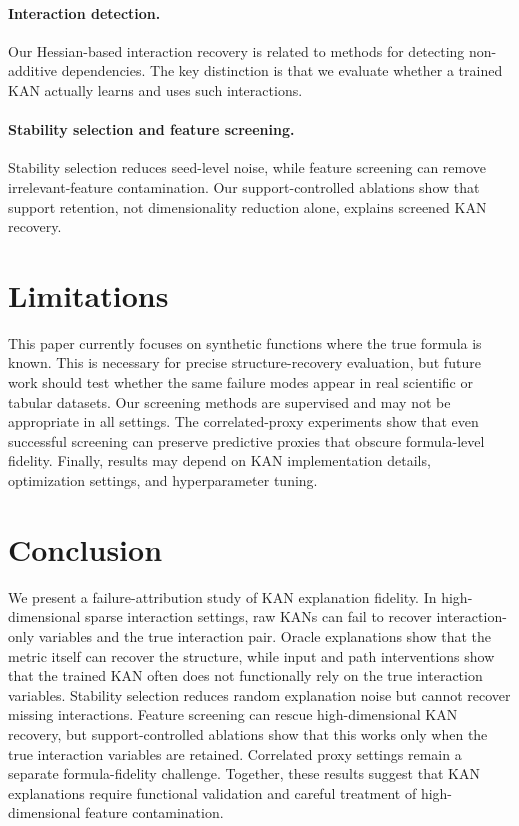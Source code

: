 \documentclass[11pt]{article}
\begin{document}
\paragraph{Interaction detection.}
Our Hessian-based interaction recovery is related to methods for detecting non-additive dependencies.
The key distinction is that we evaluate whether a trained KAN actually learns and uses such interactions.

\paragraph{Stability selection and feature screening.}
Stability selection reduces seed-level noise, while feature screening can remove irrelevant-feature contamination.
Our support-controlled ablations show that support retention, not dimensionality reduction alone, explains screened KAN recovery.

\section{Limitations}

This paper currently focuses on synthetic functions where the true formula is known.
This is necessary for precise structure-recovery evaluation, but future work should test whether the same failure modes appear in real scientific or tabular datasets.
Our screening methods are supervised and may not be appropriate in all settings.
The correlated-proxy experiments show that even successful screening can preserve predictive proxies that obscure formula-level fidelity.
Finally, results may depend on KAN implementation details, optimization settings, and hyperparameter tuning.

\section{Conclusion}

We present a failure-attribution study of KAN explanation fidelity.
In high-dimensional sparse interaction settings, raw KANs can fail to recover interaction-only variables and the true interaction pair.
Oracle explanations show that the metric itself can recover the structure, while input and path interventions show that the trained KAN often does not functionally rely on the true interaction variables.
Stability selection reduces random explanation noise but cannot recover missing interactions.
Feature screening can rescue high-dimensional KAN recovery, but support-controlled ablations show that this works only when the true interaction variables are retained.
Correlated proxy settings remain a separate formula-fidelity challenge.
Together, these results suggest that KAN explanations require functional validation and careful treatment of high-dimensional feature contamination.
\end{document}
